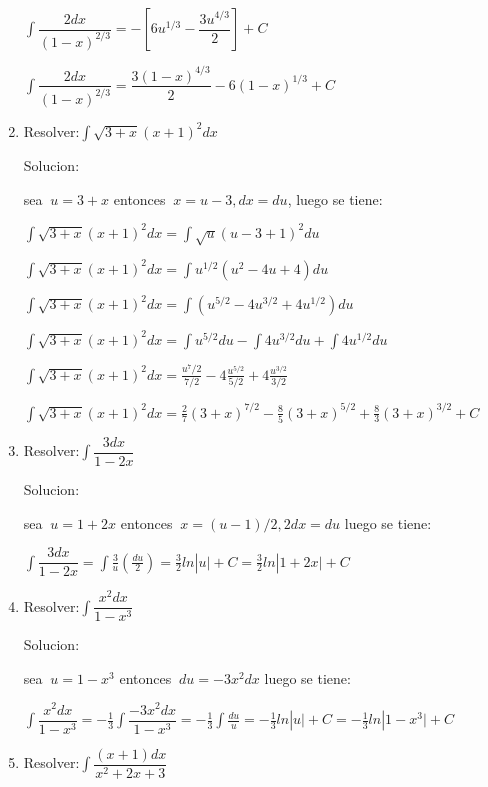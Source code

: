 \documentclass[10pt,a4paper]{book}
\newcommand{\ds}{\displaystyle}
\begin{document}
\begin{enumerate}
        $\ds\int \dfrac{2dx}{(1-x)^{2/3}}=-\left[6u^{1/3}-\dfrac{3u^{4/3}}{2}\right]+C$

        $\ds\int \dfrac{2dx}{(1-x)^{2/3}}=\dfrac{3(1-x)^{4/3}}{2}-6(1-x)^{1/3}+C$

    \vspace{0.5cm}
    \item Resolver:$\ds\int \sqrt{3+x}(x+1)^2dx$ 

        Solucion:

        sea $\ds\ u=3+x$ entonces $\ds\ x=u-3,dx=du$, luego se tiene:

        $\ds\int \sqrt{3+x}(x+1)^2dx=\int \sqrt{u}(u-3+1)^2du $ 

        $\ds\int \sqrt{3+x}(x+1)^2dx=\int u^{1/2}(u^2-4u+4)du$
        
        $\ds\int \sqrt{3+x}(x+1)^2dx=\int(u^{5/2}-4u^{3/2}+4u^{1/2})du$
        
        $\ds\int \sqrt{3+x}(x+1)^2dx=\int u^{5/2}du-\int 4u^{3/2}du+\int 4u^{1/2}du$ 

        $\ds\int \sqrt{3+x}(x+1)^2dx=\frac{u^7/2}{7/2}-4\frac{u^{5/2}}{5/2}+4\frac{u^{3/2}}{3/2}$ 

        $\ds\int \sqrt{3+x}(x+1)^2dx=\frac{2}{7}(3+x)^{7/2}-\frac{8}{5}(3+x)^{5/2}+\frac{8}{3}(3+x)^{3/2}+C$


        
     \vspace{0.5cm}
    \item Resolver:$\ds\int \dfrac{3dx}{1-2x}$

        Solucion:

        sea $\ds\ u=1+2x$ entonces $\ds\ x=(u-1)/2,2dx=du$ luego se tiene:

        $\ds\int \dfrac{3dx}{1-2x}=\int\frac{3}{u}\left(\frac{du}{2}\right)=\frac{3}{2}ln|u\vert+C=\frac{3}{2}ln|1+2x \vert+C$




    \vspace{0.5cm}
    \item Resolver:$\ds\int\dfrac{x^2dx}{1-x^3}$
    
        Solucion:

        sea $\ds\ u=1-x^3$ entonces $\ds\ du=-3x^2dx$ luego se tiene:

        $\ds\int\dfrac{x^2dx}{1-x^3}=-\frac{1}{3}\int \dfrac{-3x^2dx}{1-x^3}=-\frac{1}{3}\int\frac{du}{u}=-\frac{1}{3}ln|u\vert+C
        =-\frac{1}{3}ln|1-x^3\vert+C $

    \vspace{0.5cm}
    \item Resolver:$\ds\int\dfrac{(x+1)dx}{x^2+2x+3}$
    

\end{enumerate}
\end{document}
